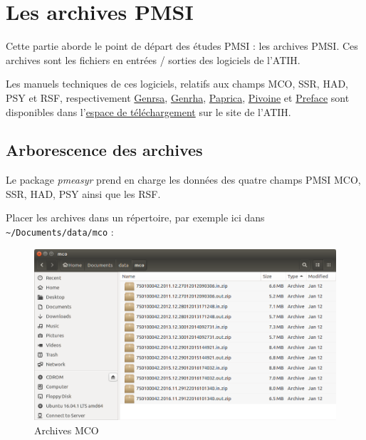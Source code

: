 \documentclass[]{book}
\begin{document}
\chapter{Les archives PMSI}\label{archives}

Cette partie aborde le point de départ des études PMSI : les archives
PMSI. Ces archives sont les fichiers en entrées / sorties des logiciels
de l'ATIH.

Les manuels techniques de ces logiciels, relatifs aux champs MCO, SSR,
HAD, PSY et RSF, respectivement
\href{http://atih.sante.fr/plateformes-de-transmission-et-logiciels/logiciels-espace-de-telechargement\#G}{Genrsa},
\href{http://atih.sante.fr/plateformes-de-transmission-et-logiciels/logiciels-espace-de-telechargement\#G}{Genrha},
\href{http://atih.sante.fr/plateformes-de-transmission-et-logiciels/logiciels-espace-de-telechargement\#P}{Paprica},
\href{http://atih.sante.fr/plateformes-de-transmission-et-logiciels/logiciels-espace-de-telechargement\#P}{Pivoine}
et
\href{http://atih.sante.fr/plateformes-de-transmission-et-logiciels/logiciels-espace-de-telechargement\#P}{Preface}
sont disponibles dans
l'\href{http://atih.sante.fr/plateformes-de-transmission-et-logiciels/logiciels-espace-de-telechargement}{espace
de téléchargement} sur le site de l'ATIH.

\section{Arborescence des archives}\label{arborescence-des-archives}

Le package \emph{pmeasyr} prend en charge les données des quatre champs
PMSI MCO, SSR, HAD, PSY ainsi que les RSF.

Placer les archives dans un répertoire, par exemple ici dans
\texttt{\textasciitilde{}/Documents/data/mco} :

\begin{figure}[htbp]
\centering
\includegraphics{images/archives_mco.png}
\caption{Archives MCO}
\end{figure}
\end{document}

